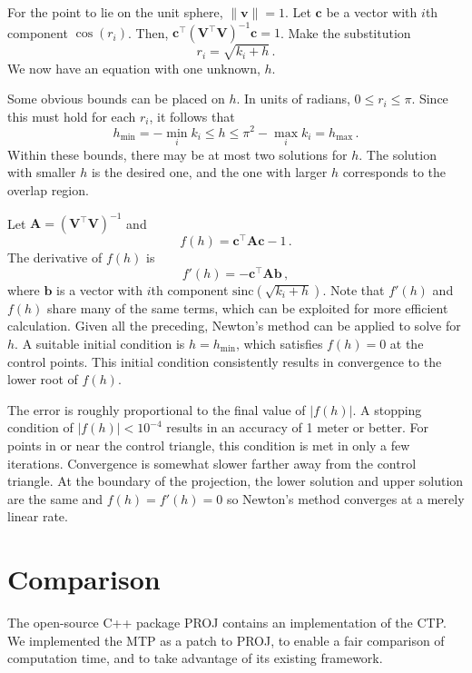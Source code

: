 \documentclass[]{interact}
\begin{document}
For the point to lie on the unit sphere, $\|\mathbf v\| = 1$. Let $\mathbf c$
be a vector with $i$th component $\cos\left(r_i \right)$. Then,
$\mathbf c^\top \left(\mathbf V^\top \mathbf V\right )^{-1} \mathbf c = 1$.
Make the substitution
\begin{equation}\label{eq:inverser}
  r_i = \sqrt{k_i + h} \,.
\end{equation} We now have an equation with one unknown, $h$.

Some obvious bounds can be placed on $h$. In units of radians,
$0 \le r_i \le \pi$. Since this must hold for each $r_i$, it follows that
\begin{equation}
   h_{\min} = -\min_i k_i \le h \le \pi^2 - \max_i k_i = h_{\max}\,.
\end{equation}
Within these bounds, there may be at most two solutions for $h$. The solution
with smaller $h$ is the desired one, and the one with larger $h$ corresponds to
the overlap region.

Let $\mathbf A = \left(\mathbf V^\top \mathbf V\right )^{-1}$ and
\begin{equation}\label{eq:inversefh}
f(h) = \mathbf c^\top \mathbf A \mathbf c - 1 \,.
\end{equation}
The derivative of $f(h)$ is
\begin{equation}\label{eq:inversefph}
  f'(h) = -\mathbf c^\top \mathbf A \mathbf b \,,
\end{equation}
where $\mathbf b$ is a vector with $i$th component
$\mathrm{sinc}\left(\sqrt{k_i + h}\right)$.
Note that $f'(h)$ and $f(h)$ share many of the same terms, which can be
exploited for more efficient calculation. Given all the preceding, Newton's
method can be applied to solve for $h$. A suitable initial condition is
$h = h_{\min}$, which satisfies $f(h) = 0$ at the control points. This initial
condition consistently results in convergence to the lower root of $f(h)$.

The error is roughly proportional to the final value of $|f(h)|$. A stopping
condition of $|f(h)| < 10^{-4}$ results in an accuracy of 1 meter or better.
For points in or near the control triangle, this condition is met in only a
few iterations. Convergence is somewhat slower farther away from the
control triangle. At the boundary of the projection,
the lower solution and upper solution are the same and $f(h)=f'(h)=0$
so Newton's method converges at a merely linear rate. \citep{burden}

\section{Comparison}
The open-source C++ package PROJ \citep{proj} contains an implementation of the
CTP. We implemented the MTP as a patch to PROJ, to enable a fair comparison of
computation time, and to take advantage of its existing framework.
\end{document}
